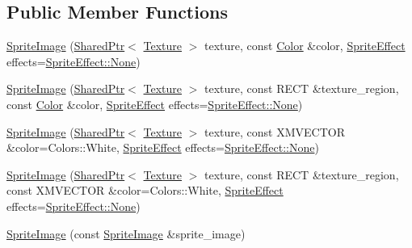 \subsection*{Public Member Functions}
\begin{DoxyCompactItemize}
\item 
\hyperlink{classmage_1_1_sprite_image_a5e8e61ee100421100c3a065ae2cc2ad3}{Sprite\+Image} (\hyperlink{namespacemage_a1e01ae66713838a7a67d30e44c67703e}{Shared\+Ptr}$<$ \hyperlink{classmage_1_1_texture}{Texture} $>$ texture, const \hyperlink{structmage_1_1_color}{Color} \&color, \hyperlink{namespacemage_a9cfe18123066ba4236f548f9de75d881}{Sprite\+Effect} effects=\hyperlink{namespacemage_a9cfe18123066ba4236f548f9de75d881a6adf97f83acf6453d4a6a4b1070f3754}{Sprite\+Effect\+::\+None})
\item 
\hyperlink{classmage_1_1_sprite_image_a316f76baba8fbd73960f8ef7a111dce4}{Sprite\+Image} (\hyperlink{namespacemage_a1e01ae66713838a7a67d30e44c67703e}{Shared\+Ptr}$<$ \hyperlink{classmage_1_1_texture}{Texture} $>$ texture, const R\+E\+CT \&texture\+\_\+region, const \hyperlink{structmage_1_1_color}{Color} \&color, \hyperlink{namespacemage_a9cfe18123066ba4236f548f9de75d881}{Sprite\+Effect} effects=\hyperlink{namespacemage_a9cfe18123066ba4236f548f9de75d881a6adf97f83acf6453d4a6a4b1070f3754}{Sprite\+Effect\+::\+None})
\item 
\hyperlink{classmage_1_1_sprite_image_a64bef2a20b5046a780251a6b603b2d59}{Sprite\+Image} (\hyperlink{namespacemage_a1e01ae66713838a7a67d30e44c67703e}{Shared\+Ptr}$<$ \hyperlink{classmage_1_1_texture}{Texture} $>$ texture, const X\+M\+V\+E\+C\+T\+OR \&color=Colors\+::\+White, \hyperlink{namespacemage_a9cfe18123066ba4236f548f9de75d881}{Sprite\+Effect} effects=\hyperlink{namespacemage_a9cfe18123066ba4236f548f9de75d881a6adf97f83acf6453d4a6a4b1070f3754}{Sprite\+Effect\+::\+None})
\item 
\hyperlink{classmage_1_1_sprite_image_a75301f690877e3bbb88f02340b3c78ea}{Sprite\+Image} (\hyperlink{namespacemage_a1e01ae66713838a7a67d30e44c67703e}{Shared\+Ptr}$<$ \hyperlink{classmage_1_1_texture}{Texture} $>$ texture, const R\+E\+CT \&texture\+\_\+region, const X\+M\+V\+E\+C\+T\+OR \&color=Colors\+::\+White, \hyperlink{namespacemage_a9cfe18123066ba4236f548f9de75d881}{Sprite\+Effect} effects=\hyperlink{namespacemage_a9cfe18123066ba4236f548f9de75d881a6adf97f83acf6453d4a6a4b1070f3754}{Sprite\+Effect\+::\+None})
\item 
\hyperlink{classmage_1_1_sprite_image_a7ce3b568dc3ff96e7467a8d00bba997d}{Sprite\+Image} (const \hyperlink{classmage_1_1_sprite_image}{Sprite\+Image} \&sprite\+\_\+image)

\end{DoxyCompactItemize}
